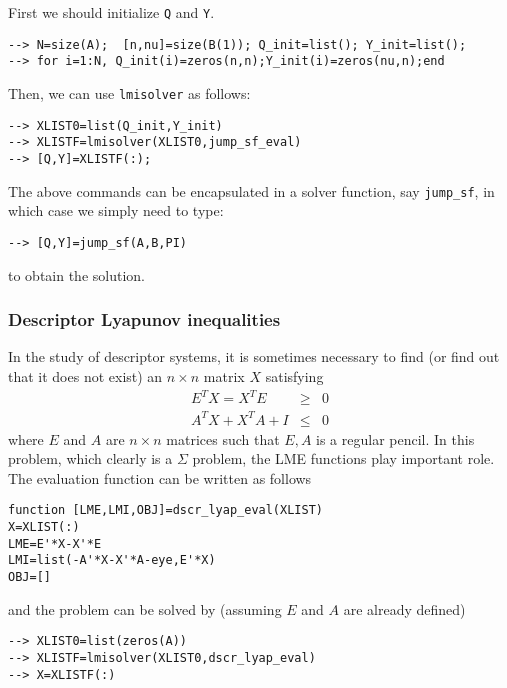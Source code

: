 \documentclass{article}
\begin{document}
First we should initialize {\tt Q} and {\tt Y}. 
\begin{verbatim}
--> N=size(A);  [n,nu]=size(B(1)); Q_init=list(); Y_init=list();
--> for i=1:N, Q_init(i)=zeros(n,n);Y_init(i)=zeros(nu,n);end
\end{verbatim}
Then, we can use {\tt lmisolver} as follows:
\begin{verbatim}
--> XLIST0=list(Q_init,Y_init)
--> XLISTF=lmisolver(XLIST0,jump_sf_eval)
--> [Q,Y]=XLISTF(:);
\end{verbatim}

The above commands can be encapsulated in a solver function, say 
{\tt jump{\_}sf},
in which case we simply need to type:
\begin{verbatim}
--> [Q,Y]=jump_sf(A,B,PI)         
\end{verbatim}
to obtain the solution.


\subsubsection{Descriptor Lyapunov inequalities}
\label{ex3}
In the study of descriptor systems, it is sometimes 
necessary to find (or find out that it does not exist)
an $n\times n$ matrix $X$ satisfying
\begin{eqnarray*}
E^TX=X^TE&\geq&0\\
A^TX+X^TA+I&\leq&0
\end{eqnarray*}
where $E$ and $A$ are $n\times n$ matrices such that ${E,A}$ is a regular pencil.
In this problem, which clearly is a $\Sigma$ problem,
the LME functions play important role. The evaluation function
can be written as follows
\begin{verbatim}
function [LME,LMI,OBJ]=dscr_lyap_eval(XLIST)
X=XLIST(:)
LME=E'*X-X'*E
LMI=list(-A'*X-X'*A-eye,E'*X)
OBJ=[]
\end{verbatim}
and the problem can be solved by (assuming $E$ and $A$ are
already defined)
\begin{verbatim}
--> XLIST0=list(zeros(A))
--> XLISTF=lmisolver(XLIST0,dscr_lyap_eval)
--> X=XLISTF(:)
\end{verbatim}
\end{document}
